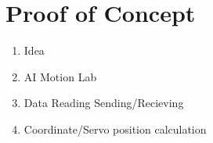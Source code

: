 \chapter{Proof of Concept}

\begin{enumerate}
  \item Idea
  \item AI Motion Lab
  \item Data
  \subitem Reading
  \subitem Sending/Recieving
  \item Coordinate/Servo position calculation
\end{enumerate}